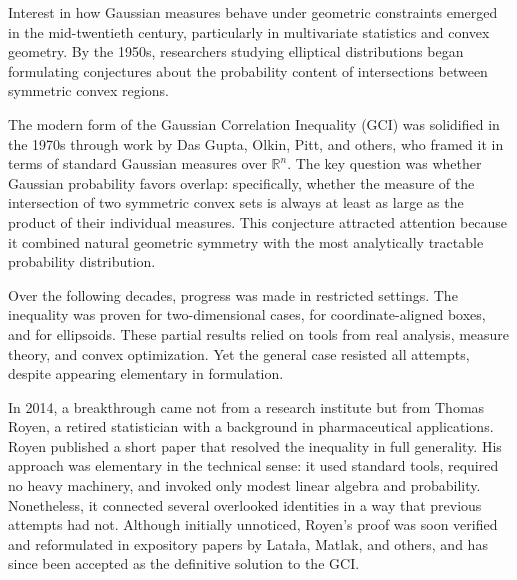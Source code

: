 \begin{historical}
Interest in how Gaussian measures behave under geometric constraints emerged in the mid-twentieth century, particularly in multivariate statistics and convex geometry. By the 1950s, researchers studying elliptical distributions began formulating conjectures about the probability content of intersections between symmetric convex regions.

The modern form of the Gaussian Correlation Inequality (GCI) was solidified in the 1970s through work by Das Gupta, Olkin, Pitt, and others, who framed it in terms of standard Gaussian measures over \(\mathbb{R}^n\). The key question was whether Gaussian probability favors overlap: specifically, whether the measure of the intersection of two symmetric convex sets is always at least as large as the product of their individual measures. This conjecture attracted attention because it combined natural geometric symmetry with the most analytically tractable probability distribution.

Over the following decades, progress was made in restricted settings. The inequality was proven for two-dimensional cases, for coordinate-aligned boxes, and for ellipsoids. These partial results relied on tools from real analysis, measure theory, and convex optimization. Yet the general case resisted all attempts, despite appearing elementary in formulation.

In 2014, a breakthrough came not from a research institute but from Thomas Royen, a retired statistician with a background in pharmaceutical applications. Royen published a short paper that resolved the inequality in full generality. His approach was elementary in the technical sense: it used standard tools, required no heavy machinery, and invoked only modest linear algebra and probability. Nonetheless, it connected several overlooked identities in a way that previous attempts had not. Although initially unnoticed, Royen's proof was soon verified and reformulated in expository papers by Latała, Matlak, and others, and has since been accepted as the definitive solution to the GCI.
\end{historical}
